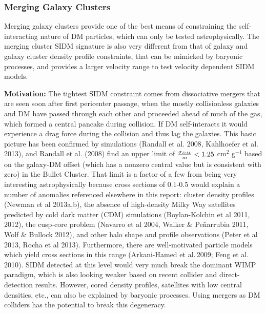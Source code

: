 \subsubsection{Merging Galaxy Clusters}

Merging galaxy clusters provide one of the best means of constraining the
self-interacting nature of DM particles, which can only be tested
astrophysically. The merging cluster SIDM signature is also very different from
that of galaxy and galaxy cluster density profile constraints, that can be
mimicked by baryonic processes, and provides a larger velocity range to test
velocity dependent SIDM models.

{\bf Motivation:} The tightest SIDM constraint comes from dissociative mergers
that are seen soon after first pericenter passage, when the mostly collisionless
galaxies and DM have passed through each other and proceeded ahead of much of
the gas, which formed a central pancake during collision.  If DM self-interacts
it would experience a drag force during the collision and thus lag the galaxies.
This basic picture has been confirmed by simulations (Randall et al. 2008,
Kahlhoefer et al. 2013), and Randall et al. (2008) find an upper limit of
${\sigma_{DM}\over m} < 1.25$ cm$^2$ g$^{-1}$ based on the galaxy-DM offset
(which has a nonzero central value but is consistent with zero) in the Bullet
Cluster.  That limit is a factor of a few from being very interesting
astrophysically because cross sections of 0.1-0.5 would explain a number of
anomalies referenced elsewhere in this report: cluster density profiles (Newman
et al 2013a,b), the absence of high-density Milky Way satellites predicted by
cold dark matter (CDM) simulations (Boylan-Kolchin et al 2011, 2012), the
cusp-core problem (Navarro et al 2004, Walker \& Pe\~{n}arrubia 2011, Wolf \&
Bullock 2012), and other halo shape and profile observations (Peter et al 2013,
Rocha et al 2013).  Furthermore, there are well-motivated particle models which
yield cross sections in this range (Arkani-Hamed et al.\,2009; Feng et
al.\,2010).  SIDM detected at this level would very much break the dominant WIMP
paradigm, which is also looking weaker based on recent collider and
direct-detection results.  However, cored density profiles, satellites with low
central densities, etc., can also be explained by baryonic processes. Using
mergers as DM colliders has the potential to break this degeneracy.

